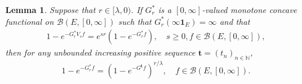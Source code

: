 \documentclass[12pt,a4paper]{amsart}
\numberwithin{equation}{section}
\theoremstyle{plain}
\newtheorem{lem}[thm]{Lemma}
\theoremstyle{definition}
\theoremstyle{remark}
\begin{document}
\begin{lem} \label{prop:G*:H1:H2:H3:H4}
	Suppose that $r \in [\lambda,0)$.
	If $G^*_r$ is a $[0,\infty]$-valued monotone concave functional on $\mathcal B(E,[0,\infty])$ such that $G^*_r(\infty \mathbf 1_E) = \infty$ and that
	\begin{align}
	1 - e^{-G^*_r V_s f}
	= e^{s r} (1 - e^{- G_r^* f}),
	\quad s\geq 0, f\in \mathcal B(E,[0,\infty]),
	\end{align}
	then for any unbounded increasing positive sequence $\mathbf t = (t_n)_{n\in \mathbb N}$,
\begin{equation}
	1 - e^{-G_r^* f} = (1 - e^{- G^\mathbf t f})^{r/\lambda}, \quad f \in \mathcal B(E,[0,\infty]).
\end{equation}
\end{lem}
\end{document}
